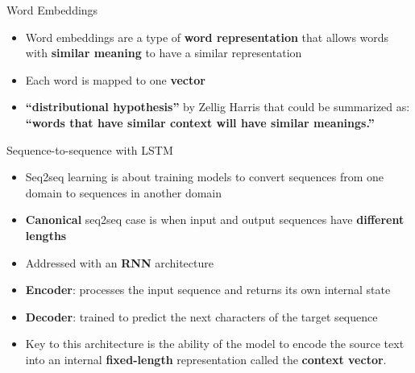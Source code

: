 \documentclass{beamer}
\begin{document}
\begin{frame}{Word Embeddings}
	\begin{itemize}


\item Word embeddings are a type of \textbf{word representation} that allows words with \textbf{similar meaning} to have a similar representation

\item Each word is mapped to one \textbf{vector}

\item \textbf{“distributional hypothesis”} by Zellig Harris that could be summarized as: \textbf{“words that have similar context will have similar meanings.”}

	\end{itemize}
\end{frame}




\begin{frame}{Sequence-to-sequence with LSTM}
	\begin{itemize}
		\item Seq2seq learning is about training
		models to convert sequences from one domain to sequences in another domain
		
		\item \textbf{Canonical} seq2seq case is when input and output sequences have \textbf{different lengths}
		
		\item Addressed with an \textbf{RNN} architecture
		
		\item \textbf{Encoder}: processes the input sequence and returns its own internal state
		
		
		\item \textbf{Decoder}: trained to predict the next characters of the target sequence
		
		\item Key to this architecture is the ability of the model to encode the source text into an internal \textbf{fixed-length} representation called the \textbf{context vector}.
		
	\end{itemize}
\end{frame}

\end{document}
